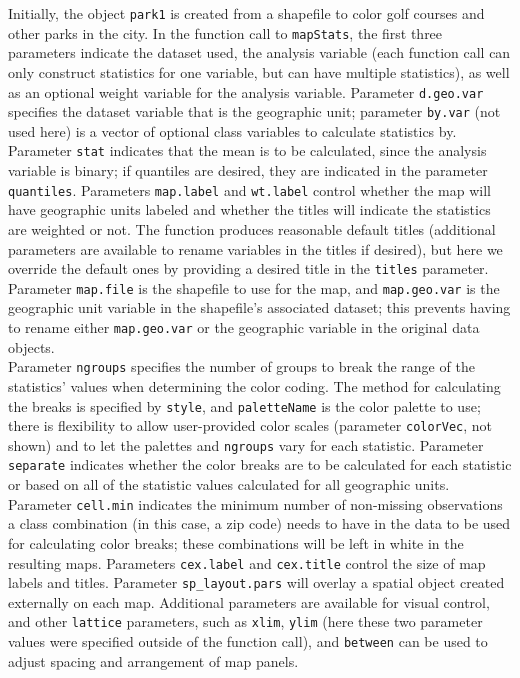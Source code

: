 \indent
Initially, the object \texttt{park1} is created from a shapefile to color golf courses and other parks in the city.  In the function call to \texttt{mapStats}, the first three parameters indicate the dataset used, the analysis variable (each function call can only construct statistics for one variable, but can have multiple statistics), as well as an optional weight variable for the analysis variable.  Parameter \texttt{d.geo.var} specifies the dataset variable that is the geographic unit; parameter \texttt{by.var} (not used here) is a vector of optional class variables to calculate statistics by.  Parameter \texttt{stat} indicates that the mean is to be calculated, since the analysis variable is binary; if quantiles are desired, they are indicated in the parameter \texttt{quantiles}.  Parameters \texttt{map.label} and \texttt{wt.label} control whether the map will have geographic units labeled and whether the titles will indicate the statistics are weighted or not.  The function produces reasonable default titles (additional parameters are available to rename variables in the titles if desired), but here we override the default ones by providing a desired title in the \texttt{titles} parameter.  Parameter \texttt{map.file} is the shapefile to use for the map, and \texttt{map.geo.var} is the geographic unit variable in the shapefile's associated dataset; this prevents having to rename either \texttt{map.geo.var} or the geographic variable in the original data objects.  
\\\indent
Parameter \texttt{ngroups} specifies the number of groups to break the range of the statistics' values when determining the color coding.  The method for calculating the breaks is specified by \texttt{style}, and \texttt{paletteName} is the color palette to use; there is flexibility to allow user-provided color scales (parameter \texttt{colorVec}, not shown) and to let the palettes and \texttt{ngroups} vary for each statistic.  Parameter \texttt{separate} indicates whether the color breaks are to be calculated for each statistic or based on all of the statistic values calculated for all geographic units.  Parameter \texttt{cell.min} indicates the minimum number of non-missing observations a class combination (in this case, a zip code) needs to have in the data to be used for calculating color breaks; these combinations will be left in white in the resulting maps.  Parameters \texttt{cex.label} and \texttt{cex.title} control the size of map labels and titles.  Parameter \texttt{sp\_layout.pars} will overlay a spatial object created externally on each map.  Additional parameters are available for visual control, and other \texttt{lattice} parameters, such as \texttt{xlim}, \texttt{ylim} (here these two parameter values were specified outside of the function call), and \texttt{between} can be used to adjust spacing and arrangement of map panels.
